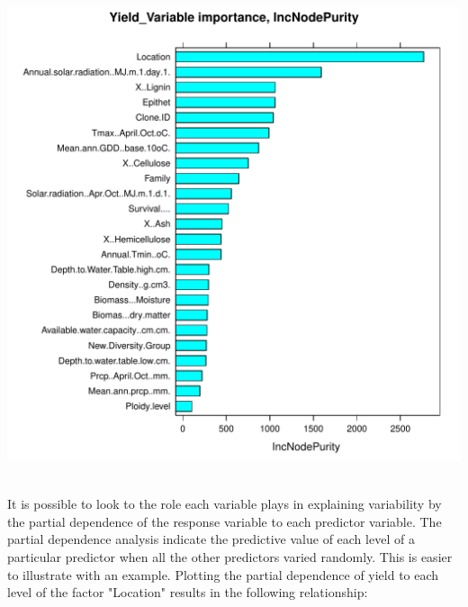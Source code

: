 \documentclass{article}\usepackage[]{graphicx}\usepackage[]{color}
\makeatletter
\def\maxwidth{ %
  \ifdim\Gin@nat@width>\linewidth
    \linewidth
  \else
    \Gin@nat@width
  \fi
}
\newenvironment{knitrout}{}{} %
\makeatother
\begin{document}
\begin{knitrout}
{}




{\centering \includegraphics[width=\maxwidth]{figure/VariableSelectionApproach-3} 

}



\end{knitrout}
\\

It is possible to look to the role each variable plays in explaining variability by the partial dependence of the response variable to each predictor variable. The partial dependence analysis indicate the predictive value of each level of a particular predictor when all the other predictors varied randomly. This is easier to illustrate with an example. Plotting the partial dependence of yield to each level of the factor "Location" results in the following relationship:\\
\end{document}
